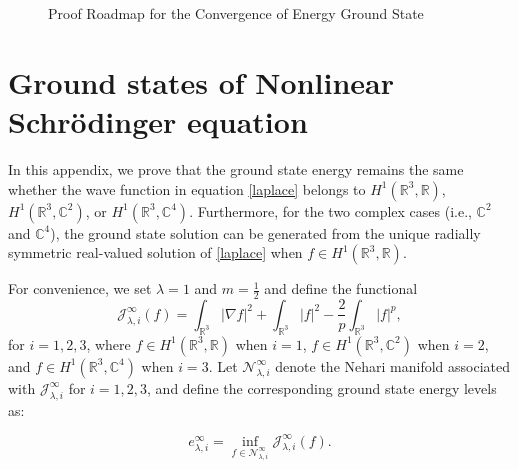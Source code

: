 \documentclass{amsart}
\theoremstyle{plain}
\theoremstyle{definition}
\theoremstyle{remark}
\numberwithin{equation}{section} \numberwithin{figure}{section}
\begin{document}
\begin{figure}[htbp]
  
\centering
{}
\caption{ Proof Roadmap for the Convergence of Energy Ground State}
\label{fig:diagram_2}
\end{figure}

\appendix

\section{Ground states of Nonlinear Schr\"odinger equation}\label{a_B}
In this appendix, we prove that the ground state energy remains the same whether the wave function in equation \eqref{laplace} belongs to \( H^1(\mathbb{R}^3, \mathbb{R}) \), \( H^1(\mathbb{R}^3, \mathbb{C}^2) \), or \( H^1(\mathbb{R}^3, \mathbb{C}^4) \). Furthermore, for the two complex cases (i.e., \( \mathbb{C}^2 \) and \( \mathbb{C}^4 \)), the ground state solution can be generated from the unique radially symmetric real-valued solution of \eqref{laplace} when \( f \in H^1(\mathbb{R}^3, \mathbb{R}) \). 

For convenience, we set \( \lambda = 1 \) and \( m= \frac{1}{2}\) and define the functional
\[
\mathcal{J}^\infty_{\lambda, i}(f) = \int_{\mathbb{R}^3} |\nabla f|^2  + \int_{\mathbb{R}^3}|f|^2- \frac{2}{p} \int_{\mathbb{R}^3} |f|^p,
\]
for \( i = 1,2,3 \), where \( f \in H^1(\mathbb{R}^3, \mathbb{R}) \) when \( i=1 \), \( f \in H^1(\mathbb{R}^3, \mathbb{C}^2) \) when \( i=2 \), and \( f \in H^1(\mathbb{R}^3, \mathbb{C}^4) \) when \( i=3 \).
Let \( \mathcal{N}^\infty_{\lambda, i} \) denote the Nehari manifold associated with \( \mathcal{J}^\infty_{\lambda, i} \) for \( i = 1, 2, 3 \), and define the corresponding ground state energy levels as:

\[
e^\infty_{\lambda,i} = \inf_{f \in \mathcal{N}^\infty_{\lambda, i}} \mathcal{J}^\infty_{\lambda, i}(f).
\]
\end{document}
